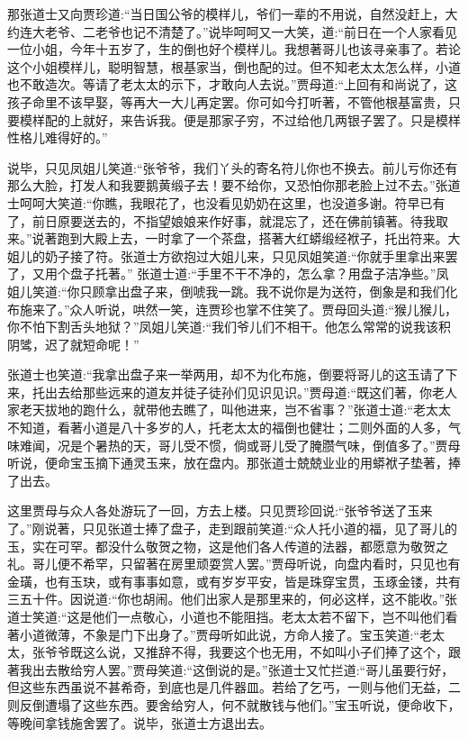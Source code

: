 \begin{parag}
    那张道士又向贾珍道:“当日国公爷的模样儿，爷们一辈的不用说，自然没赶上，大约连大老爷、二老爷也记不清楚了。”说毕呵呵又一大笑，道:“前日在一个人家看见一位小姐，今年十五岁了，生的倒也好个模样儿。我想著哥儿也该寻亲事了。若论这个小姐模样儿，聪明智慧，根基家当，倒也配的过。但不知老太太怎么样，小道也不敢造次。等请了老太太的示下，才敢向人去说。”贾母道:“上回有和尚说了，这孩子命里不该早娶，等再大一大儿再定罢。你可如今打听著，不管他根基富贵，只要模样配的上就好，来告诉我。便是那家子穷，不过给他几两银子罢了。只是模样性格儿难得好的。”
\end{parag}


\begin{parag}
    说毕，只见凤姐儿笑道:“张爷爷，我们丫头的寄名符儿你也不换去。前儿亏你还有那么大脸，打发人和我要鹅黄缎子去！要不给你，又恐怕你那老脸上过不去。”张道士呵呵大笑道:“你瞧，我眼花了，也没看见奶奶在这里，也没道多谢。符早已有了，前日原要送去的，不指望娘娘来作好事，就混忘了，还在佛前镇著。待我取来。”说著跑到大殿上去，一时拿了一个茶盘，搭著大红蟒缎经袱子，托出符来。大姐儿的奶子接了符。张道士方欲抱过大姐儿来，只见凤姐笑道:“你就手里拿出来罢了，又用个盘子托著。” 张道士道:“手里不干不净的，怎么拿？用盘子洁净些。”凤姐儿笑道:“你只顾拿出盘子来，倒唬我一跳。我不说你是为送符，倒象是和我们化布施来了。”众人听说，哄然一笑，连贾珍也掌不住笑了。贾母回头道:“猴儿猴儿，你不怕下割舌头地狱？”凤姐儿笑道:“我们爷儿们不相干。他怎么常常的说我该积阴骘，迟了就短命呢！”
\end{parag}


\begin{parag}
    张道士也笑道:“我拿出盘子来一举两用，却不为化布施，倒要将哥儿的这玉请了下来，托出去给那些远来的道友并徒子徒孙们见识见识。”贾母道:“既这们著，你老人家老天拔地的跑什么，就带他去瞧了，叫他进来，岂不省事？”张道士道:“老太太不知道，看著小道是八十多岁的人，托老太太的福倒也健壮；二则外面的人多，气味难闻，况是个暑热的天，哥儿受不惯，倘或哥儿受了腌臜气味，倒值多了。”贾母听说，便命宝玉摘下通灵玉来，放在盘内。那张道士兢兢业业的用蟒袱子垫著，捧了出去。
\end{parag}


\begin{parag}
    这里贾母与众人各处游玩了一回，方去上楼。只见贾珍回说:“张爷爷送了玉来了。”刚说著，只见张道士捧了盘子，走到跟前笑道:“众人托小道的福，见了哥儿的玉，实在可罕。都没什么敬贺之物，这是他们各人传道的法器，都愿意为敬贺之礼。哥儿便不希罕，只留著在房里顽耍赏人罢。”贾母听说，向盘内看时，只见也有金璜，也有玉玦，或有事事如意，或有岁岁平安，皆是珠穿宝贯，玉琢金镂，共有三五十件。因说道:“你也胡闹。他们出家人是那里来的，何必这样，这不能收。”张道士笑道:“这是他们一点敬心，小道也不能阻挡。老太太若不留下，岂不叫他们看著小道微薄，不象是门下出身了。”贾母听如此说，方命人接了。宝玉笑道:“老太太，张爷爷既这么说，又推辞不得，我要这个也无用，不如叫小子们捧了这个，跟著我出去散给穷人罢。”贾母笑道:“这倒说的是。”张道士又忙拦道:“哥儿虽要行好，但这些东西虽说不甚希奇，到底也是几件器皿。若给了乞丐，一则与他们无益，二则反倒遭塌了这些东西。要舍给穷人，何不就散钱与他们。”宝玉听说，便命收下，等晚间拿钱施舍罢了。说毕，张道士方退出去。
\end{parag}


